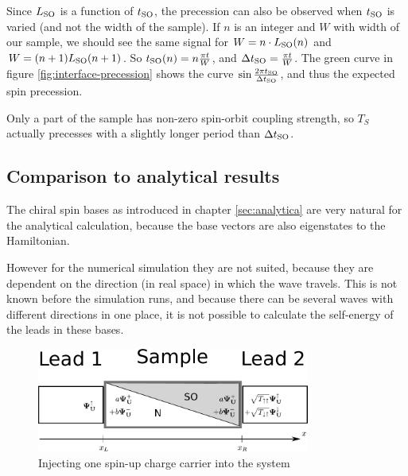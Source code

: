 Since  $L_{\textnormal{SO}}$ is a function of $t_{\textnormal{SO}}$, the precession can also be
observed when $t_{\textnormal{SO}}$ is varied (and not the width of the sample).
If $n$ is an integer and $W$ with width of our sample, we should see the
same signal for $W = n \cdot L_{\textnormal{SO}}(n)$ and $W = (n+1) L_{\textnormal{SO}}(n+1)$. So
$t_{\textnormal{SO}}(n) = n\frac{\pi t}{W}$, and $\Delta t_{\textnormal{SO}} = \frac{\pi t}{W}$.  The green
curve in figure \ref{fig:interface-precession} shows the curve
$\sin{\frac{2 \pi \ensuremath{t_{\textnormal{SO}}}}{\Delta \ensuremath{t_{\textnormal{SO}}}}}$, and thus the expected spin precession.

Only a part of the sample has non-zero spin-orbit coupling strength, so $T_S$
actually precesses with a slightly longer period than $\Delta t_{\textnormal{SO}}$.

\subsection{Comparison to analytical results}

The chiral spin bases as introduced in chapter \ref{sec:analytica} are very
natural for the analytical calculation, because the
base vectors are also eigenstates to the Hamiltonian.

However for the numerical simulation they are not suited, because they are
dependent on the direction (in real space) in which the wave travels. This
is not known before the simulation runs, and because there can be several
waves with different directions in one place, it is not possible to calculate
the self-energy of the leads in these bases.

\begin{figure}
    \begin{center}
    \includegraphics[width=0.8\textwidth]{adapting-pic.pdf}
    \end{center}
    \caption{Injecting one spin-up charge carrier into the system}
\end{figure}


